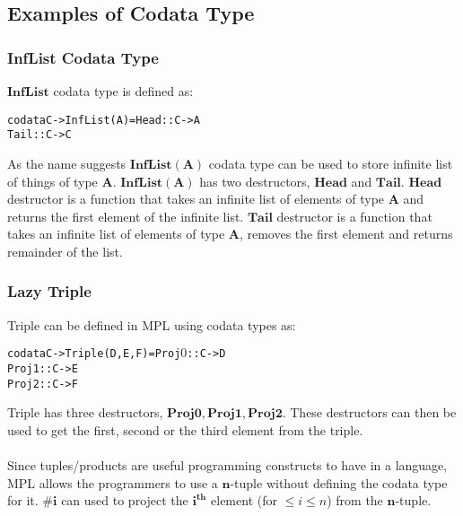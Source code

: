 \documentclass[11pt]{article}
\begin{document}
\subsection {Examples of Codata Type}
\subsubsection{InfList Codata Type}
$\mathbf{InfList}$ codata type is defined as:
\begin{alltt}
          codata C -> InfList(A) = Head :: C -> A  
                                   Tail :: C -> C  
\end{alltt}
As the name suggests $\mathbf{InfList(A)}$ codata type can be used to store infinite list of things of type $\mathbf{A}$. $\mathbf{InfList(A)}$ has two destructors, $\mathbf{Head}$ and $\mathbf{Tail}$. $\mathbf{Head}$ destructor is a function that takes an infinite list of elements of type $\mathbf{A}$ and returns the first element of the infinite list. $\mathbf{Tail}$ destructor is a function that takes an infinite list of elements of type $\mathbf{A}$, removes the first element and returns remainder of the list.
\subsubsection{Lazy Triple}
Triple can be defined in MPL using codata types as:
\begin{alltt}
          codata C -> Triple(D,E,F) = Proj\(0\) :: C -> D
                                      Proj1 :: C -> E
                                      Proj2 :: C -> F

\end{alltt}
Triple has three destructors, $\mathbf{Proj0, Proj1, Proj2}$. These destructors can then be used to get the first, second or the third element from the triple.
~~\\~~\\ 
Since tuples/products are useful programming constructs to have in a language, MPL allows the programmers to use a $\mathbf{n}$-tuple without defining the codata type for it. $\mathbf{\#i}$ can used to project the \texttt{$\mathbf{i^{th}}$} element (for $\leq i \leq n$) from the $\mathbf{n}$-tuple.
\end{document}
